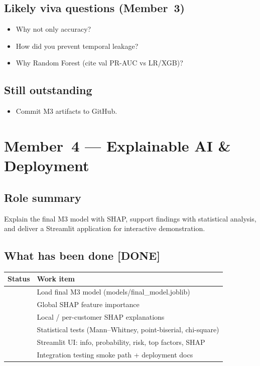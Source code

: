 \documentclass[11pt,a4paper]{article}
\newcommand{\done}{[DONE]}
\renewcommand{\texttt}[1]{#1}
\begin{document}
\subsection{Likely viva questions (Member~3)}
\begin{itemize}
  \item Why not only accuracy?
  \item How did you prevent temporal leakage?
  \item Why Random Forest (cite val PR-AUC vs LR/XGB)?
\end{itemize}

\subsection{Still outstanding}
\begin{itemize}
  \item Commit M3 artifacts to GitHub.
\end{itemize}

\newpage
\section{Member~4 --- Explainable AI \& Deployment}
\label{sec:m4}

\subsection{Role summary}
Explain the final M3 model with SHAP, support findings with statistical
analysis, and deliver a Streamlit application for interactive demonstration.

\subsection{What has been done \done{}}
\begin{tabular}{|p{}|p{}|}
\hline
\textbf{Status} & \textbf{Work item} \\
\hline
\done{} & Load final M3 model (\texttt{models/final\_model.joblib}) \\
\hline
\done{} & Global SHAP feature importance \\
\hline
\done{} & Local / per-customer SHAP explanations \\
\hline
\done{} & Statistical tests (Mann--Whitney, point-biserial, chi-square) \\
\hline
\done{} & Streamlit UI: info, probability, risk, top factors, SHAP \\
\hline
\done{} & Integration testing smoke path + deployment docs \\
\hline
\end{tabular}
\end{document}
